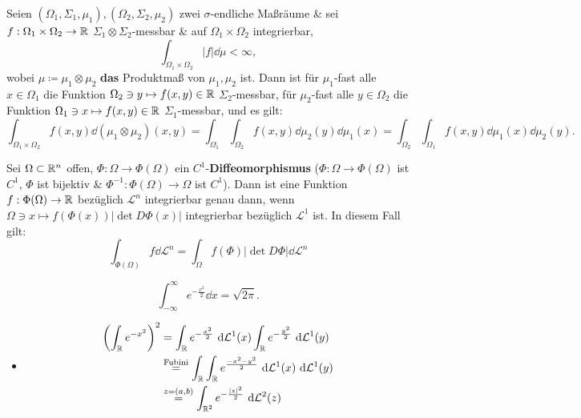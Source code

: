 \begin{theorem}[Fubini]
	Seien $ \left( \Omega_1, \Sigma_1, \mu_1 \right) , \left( \Omega_2, \Sigma_2, \mu_2 \right)  $ zwei $ \sigma $-endliche Maßräume \& sei $ f: \Omega_1 \times \Omega_2 \to \mathbb{R}  $ $ \Sigma_1 \otimes \Sigma_2 $-messbar \& auf $ \Omega_1 \times \Omega_2 $ integrierbar,
	\[
		\int _{\Omega_1 \times \Omega_2} \left| f \right| \dd \mu < \infty,
	\]
	wobei $ \mu \coloneqq \mu_1 \otimes \mu_2 $ \textbf{das} Produktmaß von $ \mu_1, \mu_2 $ ist.
	Dann ist für $ \mu_1 $-fast alle $ x \in \Omega_1 $ die Funktion $ \Omega_2 \ni y \mapsto f(x, y) \in \mathbb{R}  $ $ \Sigma_2 $-messbar, für $ \mu_2 $-fast alle $ y \in \Omega_2 $ die Funktion $ \Omega_1 \ni x \mapsto f(x, y) \in \mathbb{R}  $ $ \Sigma_1 $-messbar, und es gilt:
	\[
		\int _{\Omega_1 \times  \Omega_2} f(x, y) \dd \left( \mu_1 \otimes \mu_2 \right) \left( x, y \right) = \int _{\Omega_1} \int _{\Omega_2} f(x, y) \dd \mu_2(y) \dd \mu_1(x) = \int _{\Omega_2} \int _{\Omega_1} f(x, y) \dd\mu_1(x) \dd \mu_2 (y).
	\]
\end{theorem}

\begin{theorem}[Transformationssatz ($ \hat{=} $ Substitutionsregel aus Ana. I)]
	Sei $ \Omega \subset \mathbb{R} ^n $ offen, $ \Phi: \Omega \to \Phi(\Omega) $ ein $ C^1 $-\textbf{Diffeomorphismus} ($ \Phi: \Omega \to \Phi(\Omega) $ ist $ C^1 $, $ \Phi $ ist bijektiv \& $ \Phi^{-1} : \Phi(\Omega) \to \Omega $ ist $ C^1 $).
	Dann ist eine Funktion $ f : \Phi(\Omega) \to \mathbb{R}  $ bezüglich $ \mathcal{L} ^n $ integrierbar genau dann, wenn $ \Omega \ni x \mapsto f (\Phi(x)) \left| \det D \Phi(x) \right|  $ integrierbar bezüglich $ \mathcal{L} ^1 $ ist.
	In diesem Fall gilt:
	\[
		\int _{\Phi(\Omega)}  f \dd \mathcal{L} ^n = \int _{\Omega} f (\Phi) \left| \det D \Phi \right| \dd \mathcal{L} ^n
	\]
\end{theorem}

\begin{example}
	\[
		\int_{-\infty}^{\infty} e^{- \frac{ x^2 }{ 2 } } \dd x = \sqrt{2 \pi } .
	\]
	\begin{itemize}
		\item 
			\begin{align*}
				\left( \int _{\mathbb{R}} e^{-x^2}  \right) ^2 &= \int_{\mathbb{R} }^{} e^{- \frac{ x^2 }{ 2 } } ~\text{d} \mathcal{L} ^1(x) \int_{\mathbb{R} }^{} e^{- \frac{ y^2 }{ 2 } } ~\text{d} \mathcal{L} ^1 (y) \\
				~&\overset{\text{Fubini} }{=} \int_{\mathbb{R} } \int _{\mathbb{R} } e^{\frac{ - x^2 - y^2 }{ 2 } } ~\text{d} \mathcal{L} ^1(x) ~\text{d} \mathcal{L} ^1(y) \\
				~&\overset{z = (a, b)}{=} \int _{\mathbb{R} ^2} e^{- \frac{\left| z \right| ^2}{ 2 } } ~\text{d} \mathcal{L} ^2(z)
			\end{align*}
	\end{itemize}
	
\end{example}


